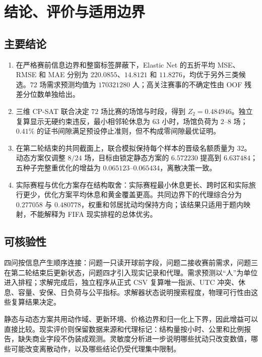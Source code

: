\section{结论、评价与适用边界}

\subsection{主要结论}

\begin{enumerate}
\setlength{\itemsep}{2pt}
\setlength{\parsep}{0pt}
  \item 在严格赛前信息边界和整窗标签屏蔽下，Elastic Net 的五折平均 MSE、RMSE 和 MAE 分别为 $220.0855$、$14.8121$ 和 $11.8276$，均优于另外三类候选。$72$ 场需求预测均值为 $170321280$ 人；高关注赛事的不确定性由 OOF 残差分位数单独给出。
  \item 三维 CP-SAT 联合决定 $72$ 场比赛的场馆与时段，得到 $Z_2=0.484946$。独立复算显示无硬约束违反，最小相邻轮休息为 $63$ 小时，场馆负荷为 $2$--$8$ 场；$0.41\%$ 的证书间隙满足预设停止准则，但不构成零间隙最优证明。
  \item 在第二轮结束的共同截面上，联合模拟保持每个样本的晋级名额质量为 $32$。动态方案仅调整 $8/24$ 场，目标由锁定静态方案的 $6.572230$ 提高到 $6.637484$；五种子完整重优化的增益为 $0.065123$--$0.065434$，离散决策一致。
  \item 实际赛程与优化方案存在结构取舍：实际赛程最小休息更长、跨时区和实际旅行更少，优化方案平均休息和黄金覆盖更高。共同边界下的代理综合分为 $0.277058$ 与 $0.480778$，权重和邻居扰动均保持方向；该结果只适用于题内映射，不能解释为 FIFA 现实排程的总体优劣。
\end{enumerate}

\subsection{可核验性}

四问按信息产生顺序连接：问题一只读开球前字段，问题二接收赛前需求，问题三在第二轮结束后更新状态，问题四才引入现实记录和代理。需求预测以“人”为单位进入排程；求解完成后，独立程序从正式 CSV 复算唯一指派、UTC 冲突、休息、容量、安保、日负荷与公平指标。求解器状态说明搜索程度，物理可行性由这些复算结果决定。

静态与动态方案共用动作域、更新环境、价格边界和归一化上下界，因此增益可以直接比较。现实评价则保留数据来源和代理标记：结构量按小时、公里和比例报告，缺失商业字段不伪装成观测。灵敏度分析进一步说明哪些扰动只改变数值，哪些可能改变离散动作，以及哪些结论仍受代理集中限制。


